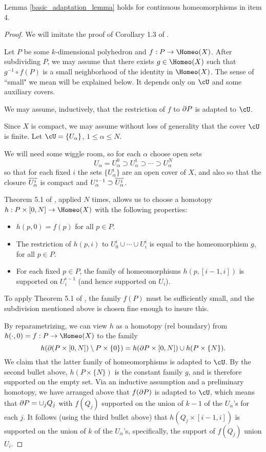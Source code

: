 \begin{lemma} \label{basic_adaptation_lemma_2}
Lemma \ref{basic_adaptation_lemma} holds for continuous homeomorphisms
in item 4.
\end{lemma}

\begin{proof}
We will imitate the proof of Corollary 1.3 of \cite{MR0283802}.

Let $P$ be some $k$-dimensional polyhedron and $f:P\to \Homeo(X)$.
After subdividing $P$, we may assume that there exists $g\in \Homeo(X)$
such that $g^{-1}\circ f(P)$ is a small neighborhood of the 
identity in $\Homeo(X)$.
The sense of ``small" we mean will be explained below.
It depends only on $\cU$ and some auxiliary covers.

We may assume, inductively, that the restriction of $f$ to $\partial P$ is adapted to $\cU$.

Since $X$ is compact, we may assume without loss of generality that the cover $\cU$ is finite.
Let $\cU = \{U_\alpha\}$, $1\le \alpha\le N$.

We will need some wiggle room, so for each $\alpha$ choose open sets
\[
	U_\alpha = U_\alpha^0 \supset U_\alpha^1 \supset \cdots \supset U_\alpha^N
\]
so that for each fixed $i$ the sets $\{U_\alpha^i\}$ are an open cover of $X$, and also so that
the closure $\overline{U_\alpha^i}$ is compact and $U_\alpha^{i-1} \supset \overline{U_\alpha^i}$.

Theorem 5.1 of \cite{MR0283802}, applied $N$ times, allows us
to choose a homotopy $h:P\times [0,N] \to \Homeo(X)$ with the following properties:
\begin{itemize}
\item $h(p, 0) = f(p)$ for all $p\in P$.
\item The restriction of $h(p, i)$ to $U_0^i \cup \cdots \cup U_i^i$ is equal to the homeomorphism $g$,
for all $p\in P$.
\item For each fixed $p\in P$, the family of homeomorphisms $h(p, [i-1, i])$ is supported on $U_i^{i-1}$
(and hence supported on $U_i$).
\end{itemize}
To apply Theorem 5.1 of \cite{MR0283802}, the family $f(P)$ must be sufficiently small,
and the subdivision mentioned above is chosen fine enough to insure this.

By reparametrizing, we can view $h$ as a homotopy (rel boundary) from $h(\cdot,0) = f: P\to\Homeo(X)$
to the family
\[
	h(\partial(P\times [0,N]) \setminus P\times \{0\}) = h(\partial P \times [0,N]) \cup h(P \times \{N\}) .
\]
We claim that the latter family of homeomorphisms is adapted to $\cU$.
By the second bullet above, $h(P\times \{N\})$ is the constant family $g$, and is therefore supported on the empty set.
Via an inductive assumption and a preliminary homotopy, we have arranged above that $f(\partial P)$ is
adapted to $\cU$, which means that $\partial P = \cup_j Q_j$ with $f(Q_j)$ supported on the union of $k-1$
of the $U_\alpha$'s for each $j$.
It follows (using the third bullet above) that $h(Q_j \times [i-1,i])$ is supported on the union of $k$ 
of the $U_\alpha$'s, specifically, the support of $f(Q_j)$ union $U_i$.
\end{proof}



